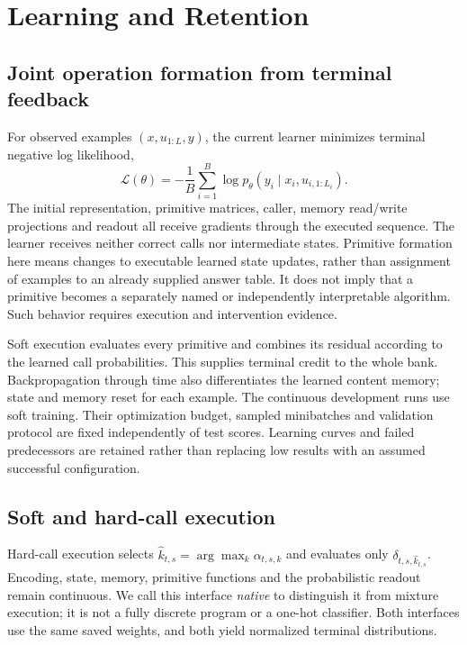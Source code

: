 \section{Learning and Retention}
\label{sec:learning-main}
\label{sec:monodromy-learning-main}

\subsection{Joint operation formation from terminal feedback}

For observed examples $(x,u_{1:L},y)$, the current learner minimizes terminal
negative log likelihood,
\begin{equation}
 \mathcal L(\theta)=-\frac1B\sum_{i=1}^{B}
    \log p_\theta(y_i\mid x_i,u_{i,1:L_i}).
\end{equation}
The initial representation, primitive matrices, caller, memory read/write
projections and readout all receive gradients through the executed sequence.
The learner receives neither correct calls nor intermediate states. Primitive
formation here means changes to executable learned state updates, rather than
assignment of examples to an already supplied answer table. It does not imply
that a primitive becomes a separately named or independently interpretable
algorithm. Such behavior requires execution and intervention evidence.

Soft execution evaluates every primitive and combines its residual according
to the learned call probabilities. This supplies terminal credit to the whole
bank. Backpropagation through time also differentiates the learned content
memory; state and memory reset for each example. The continuous development
runs use soft training. Their optimization budget, sampled minibatches and
validation protocol are fixed independently of test scores. Learning curves
and failed predecessors are retained rather than replacing low results with
an assumed successful configuration.

\subsection{Soft and hard-call execution}

Hard-call execution selects
$\widehat k_{t,s}=\arg\max_k\alpha_{t,s,k}$ and evaluates only
$\delta_{t,s,\widehat k_{t,s}}$. Encoding, state, memory, primitive functions
and the probabilistic readout remain continuous. We call this interface
\emph{native} to distinguish it from mixture execution; it is not a fully
discrete program or a one-hot classifier. Both interfaces use the same saved
weights, and both yield normalized terminal distributions.

